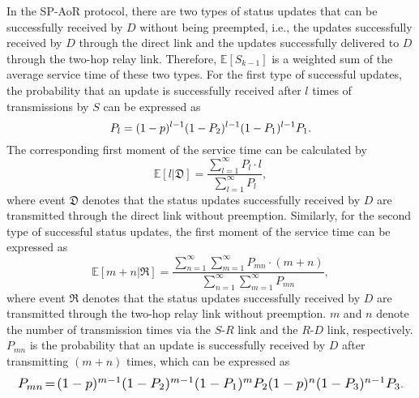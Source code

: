 \documentclass{IEEEtran}
\begin{document}

In the SP-AoR protocol, there are two types of status updates that can be successfully received by $D$ without being preempted, i.e., the updates successfully received by $D$ through the direct link and the updates successfully delivered to $D$ through the two-hop relay link.
Therefore, $\mathbb{E}[S_{k-1}]$ is a weighted sum of the average service time of these two types. For the first type of successful updates, the probability that an update is successfully received after $l$ times of transmissions by $S$ can be expressed as  
\vspace{-0.05cm}	
\begin{equation}\label{PL}
P_{l} = (1-p)^{l-1}(1-P_{2})^{l-1}(1-P_{1})^{l-1}P_{1}.	
\vspace{-0.05cm}
\end{equation}
The corresponding first moment of the service time can be calculated by
\begin{equation}\label{EL}
		\mathbb{E}[l|\mathfrak{D}]=\frac{\sum_{l=1}^{\infty}P_{l}\cdot l}{\sum_{l=1}^{\infty}P_{l}},
\end{equation}
where event $\mathfrak{D}$ denotes that the status updates successfully received by $D$ are transmitted through the direct link without preemption. Similarly, for the second type of successful status updates, the first moment of the service time can be expressed as
\vspace{-0.05cm}
\begin{equation}\label{EMN}
		\mathbb{E}[m+n|\mathfrak{R}]=\frac{\sum_{n=1}^{\infty}\sum_{m=1}^{\infty}P_{mn}\cdot(m+n)}{\sum_{n=1}^{\infty}\sum_{m=1}^{\infty}P_{mn}},
\end{equation} 
\noindent where event $\mathfrak{R}$ denotes that the status updates successfully received by $D$ are transmitted through the two-hop relay link without preemption. $m$ and $n$ denote the number of transmission times via the $S$-$R$ link and the $R$-$D$ link, respectively. $P_{mn}$ is the probability that an update is successfully received by $D$ after transmitting $(m+n)$ times, which can be expressed as
\vspace{-0.025cm}
\begin{equation}\label{PMN}
\resizebox{.98\hsize}{!}{$P_{mn} \!=\! (1-p)^{m-1}(1-P_{2})^{m-1}(1-P_{1})^{m}P_{2}(1-p)^{n}(1-P_{3})^{n-1}P_{3}$}.
\end{equation}
\end{document}
